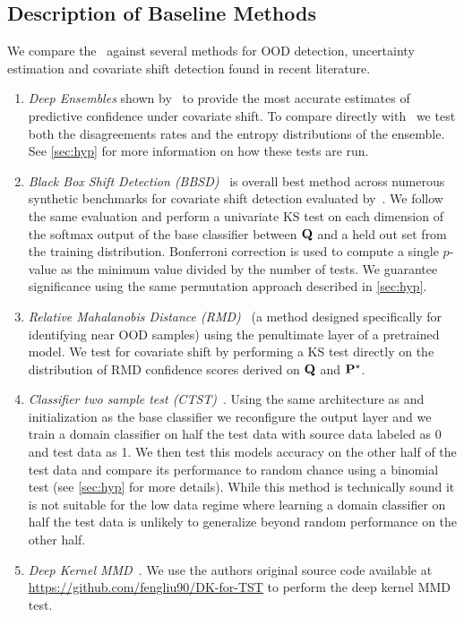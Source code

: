 \subsection{Description of Baseline Methods}
\label{subsec:baselines}
We compare the \method\ against several methods for OOD detection, uncertainty estimation and covariate shift detection found in recent literature.
\begin{enumerate}
    \item \textit{Deep Ensembles} shown by~\cite{trustuncert} to provide the most accurate estimates of predictive confidence under covariate shift.
    To compare directly with \method\ we test both the disagreements rates and the entropy distributions of the ensemble. See \autoref{sec:hyp} for more information on how these tests are run.
    \item \textit{Black Box Shift Detection (BBSD)}~\citep{bbsd} is overall best method across numerous synthetic benchmarks for covariate shift detection evaluated by~\citeauthor{failloud}.
    We follow the same evaluation and perform a univariate KS test on each dimension of the softmax output of the base classifier between $\mathbf{Q}$ and a held out set from the training distribution.
    Bonferroni correction is used to compute a single $p$-value as the minimum value divided by the number of tests.
    We guarantee significance using the same permutation approach described in \autoref{sec:hyp}.
    \item \textit{Relative Mahalanobis Distance (RMD)}~\citep{relmahala} (a method designed specifically for identifying near OOD samples) using the penultimate layer of a pretrained model.
    We test for covariate shift by performing a KS test directly on the distribution of RMD confidence scores derived on $\mathbf{Q}$ and $\mathbf{P}^\star$.
    \item \textit{Classifier two sample test (CTST)}~\citep{paz2017revisiting}. Using the same architecture as and initialization as the base classifier we reconfigure the output layer and we train
    a domain classifier on half the test data with source data labeled as 0 and test data as 1. We then test this models accuracy on the other half of the test data and compare its performance to random chance using a binomial test (see \autoref{sec:hyp} for more details).
    While this method is technically sound it is not suitable for the low data regime where learning a domain classifier on half the test data is unlikely to generalize beyond random performance on the other half.
    \item \textit{Deep Kernel MMD}~\citep{liu2020learning}. We use the authors original source code available at \url{https://github.com/fengliu90/DK-for-TST} to perform the deep kernel MMD test.

\end{enumerate}
